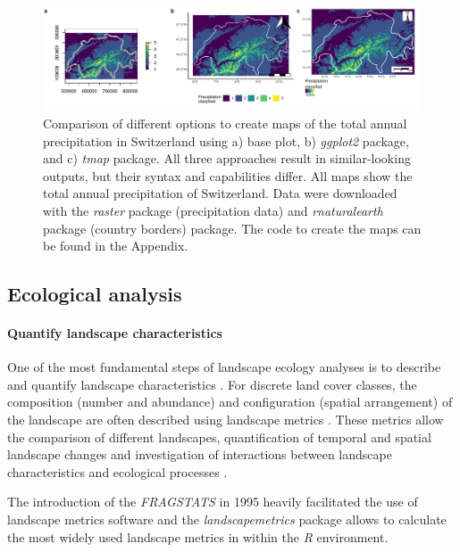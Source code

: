 \documentclass[smallextended]{svjour3}       %
\begin{document}
\begin{figure}
\includegraphics[width=\linewidth]{data/Figure_2} \caption{Comparison of different options to create maps of the total annual precipitation in Switzerland using a) base plot, b) \textit{ggplot2} package, and c) \textit{tmap} package. All three approaches result in similar-looking outputs, but their syntax and capabilities differ. All maps show the total annual precipitation of Switzerland. Data were downloaded with the \textit{raster} package (precipitation data) and \textit{rnaturalearth} package (country borders) package. The code to create the maps can be found in the Appendix.}\label{fig:fig-map}
\end{figure}

\FloatBarrier

\hypertarget{sec:ecological_analysis}{%
\subsection{Ecological analysis}\label{sec:ecological_analysis}}

\hypertarget{sec:landscape_metrics}{%
\paragraph{Quantify landscape characteristics}\label{sec:landscape_metrics}}

One of the most fundamental steps of landscape ecology analyses is to describe and quantify landscape characteristics \cite{Turner2005,Lausch2015}.
For discrete land cover classes, the composition (number and abundance) and configuration (spatial arrangement) of the landscape are often described using landscape metrics \cite{Gustafson1998,Uuemaa2009,Uuemaa2013,Gustafson2019}.
These metrics allow the comparison of different landscapes, quantification of temporal and spatial landscape changes and investigation of interactions between landscape characteristics and ecological processes \cite{Uuemaa2009}.

The introduction of the \textit{FRAGSTATS} in 1995 heavily facilitated the use of landscape metrics software \cite{McGarigal2012,Kupfer2012,Gustafson2019} and the \textit{landscapemetrics} package \cite{Hesselbarth2019} allows to calculate the most widely used landscape metrics in within the \textit{R} environment.
\end{document}
